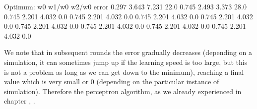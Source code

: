 \documentclass[a4paper,12pt,polish]{jupyterBook}
\begin{document}
\begin{sphinxVerbatimInput}
\begin{sphinxVerbatim}[commandchars=\\\{\}]
                           
\end{sphinxVerbatim}
\end{sphinxVerbatimInput}
\begin{sphinxVerbatimOutput}

\begin{sphinxVerbatim}[commandchars=\\\{\}]
Optimum:
   w0  w1/w0  w2/w0 error
\PYGZhy{}0.297 3.643 \PYGZhy{}7.231 22.0
\PYGZhy{}0.745 2.493 \PYGZhy{}3.373 28.0
\PYGZhy{}0.745 2.201 \PYGZhy{}4.032 0.0
\PYGZhy{}0.745 2.201 \PYGZhy{}4.032 0.0
\PYGZhy{}0.745 2.201 \PYGZhy{}4.032 0.0
\PYGZhy{}0.745 2.201 \PYGZhy{}4.032 0.0
\PYGZhy{}0.745 2.201 \PYGZhy{}4.032 0.0
\PYGZhy{}0.745 2.201 \PYGZhy{}4.032 0.0
\PYGZhy{}0.745 2.201 \PYGZhy{}4.032 0.0
\PYGZhy{}0.745 2.201 \PYGZhy{}4.032 0.0
\end{sphinxVerbatim}
\end{sphinxVerbatimOutput}

\sphinxAtStartPar
We note that in subsequent rounds the error gradually decreases (depending on a simulation, it can sometimes jump up if the learning speed is too large, but this is not a problem as long as we can get down to the minimum), reaching a final value  which is very small or 0 (depending on the particular instance of simulation). Therefore
the perceptron algorithm, as we already experienced in chapter {\hyperref[\detokenize{docs/perceptron:perc-lab}]{}}, .
\end{document}
